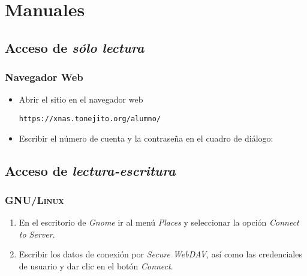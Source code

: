{
  \linespread{1}
  \cleardoublepage  
  \appendix
  \chapter{Manuales}
  \label{apdx:a}
}

    \section {Acceso de \textsl{s\'{o}lo lectura}}

      \subsection {Navegador Web}

{
\linespread{0.1}
\begin{itemize}

  \item Abrir el sitio en el navegador web

    \texttt{https://xnas.tonejito.org/alumno/}


  \item Escribir el n\'{u}mero de cuenta y la contrase\~{n}a en el cuadro de di\'{a}logo:

\end{itemize}
}


    \section {Acceso de \textsl{lectura-escritura}}

      \subsection {\textsc{GNU/Linux}}

{
\linespread{0.1}
\begin{enumerate}

  \item En el escritorio de \textsl{Gnome} ir al men\'{u} \textsl{Places} y seleccionar la opci\'{o}n \textsl{Connect to Server}.


  \item Escribir los datos de conexi\'{o}n por \textsl{Secure WebDAV}, as\'{i} como las credenciales de usuario y dar clic en el bot\'{o}n \textsl{Connect}.


\end{enumerate}
}


